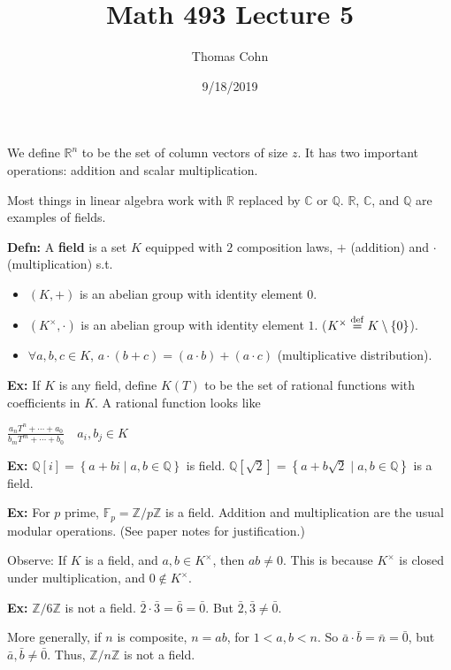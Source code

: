 \documentclass[10pt,letterpaper]{article}
\author{Thomas Cohn}
\title{Math 493 Lecture 5}
\date{9/18/2019} %
\newcommand{\n}{\hfill\break}
\newcommand{\up}{\vspace{-\baselineskip}}
\newcommand{\hangblock}[2]{\par\noindent\settowidth{\hangindent}{\textbf{#1: }}\textbf{#1: }\!\!\!#2}
\newcommand{\defn}[1]{\hangblock{Defn}{#1}}
\newcommand{\ex}[1]{\hangblock{Ex}{#1}}
\newcommand{\ptxt}[1]{\textrm{\textnormal{#1}}}
\newcommand{\inlineeq}[1]{\centerline{$\displaystyle #1$}}
\newcommand{\set}[1]{\left\{#1\right\}}
\newcommand{\integers}{\mathbb{Z}}
\newcommand{\Z}{\integers}
\newcommand{\rationals}{\mathbb{Q}}
\newcommand{\Q}{\rationals}
\newcommand{\reals}{\mathbb{R}}
\newcommand{\R}{\reals}
\newcommand{\complex}{\mathbb{C}}
\newcommand{\C}{\complex}
\newcommand{\cut}{\setminus}
\newcommand{\st}{s.t.}
\newcommand{\eqdef}{\overset{\ptxt{def}}{=}}
\begin{document}
\maketitle
\setlength\RaggedRightParindent{\parindent}
\RaggedRight

\par\noindent
We define $\R^{n}$ to be the set of column vectors of size $z$. It has two important operations: addition and scalar multiplication.\n

\par\noindent
Most things in linear algebra work with $\R$ replaced by $\C$ or $\Q$. $\R$, $\C$, and $\Q$ are examples of fields.\n

\defn{
	A \textbf{field} is a set $K$ equipped with $2$ composition laws, $+$ (addition) and $\cdot$ (multiplication) \st{}
	\begin{itemize}
		\item $(K,+)$ is an abelian group with identity element $0$.
		\item $(K^{\times},\cdot)$ is an abelian group with identity element $1$. ($K^{\times}\eqdef{}K\cut\set{0}$).
		\item $\forall{}a,b,c\in{}K$, $a\cdot(b+c)=(a\cdot{}b)+(a\cdot{}c)$ (multiplicative distribution).
	\end{itemize}\up\n
}

\ex{
	If $K$ is any field, define $K(T)$ to be the set of rational functions with coefficients in $K$. A rational function looks like\n
	\inlineeq{
		\frac{a_{n}T^{n}+\cdots+a_{0}}{b_{m}T^{m}+\cdots+b_{0}}\quad{}a_{i},b_{j}\in{}K
	}\n
}

\ex{
	$\Q[i]=\set{a+bi\mid{}a,b\in\Q}$ is field.\n
	$\Q[\sqrt{2}]=\set{a+b\sqrt{2}\mid{}a,b\in\Q}$ is a field.\n
}

\ex{
	For $p$ prime, $\mathbb{F}_{p}=\Z/p\Z$ is a field. Addition and multiplication are the usual modular operations.\n
	(See paper notes for justification.)
}

\par\noindent
Observe: If $K$ is a field, and $a,b\in{}K^{\times}$, then $ab\ne{}0$. This is because $K^{\times}$ is closed under multiplication, and $0\not\in{}K^{\times}$.\n

\ex{
	$\Z/6\Z$ is not a field.\n
	$\bar{2}\cdot\bar{3}=\bar{6}=\bar{0}$. But $\bar{2},\bar{3}\ne\bar{0}$.\n
}

\par\noindent
More generally, if $n$ is composite, $n=ab$, for $1<a,b<n$. So $\bar{a}\cdot\bar{b}=\bar{n}=\bar{0}$, but $\bar{a},\bar{b}\ne\bar{0}$.\n
Thus, $\Z/n\Z$ is not a field.\n
\end{document}
